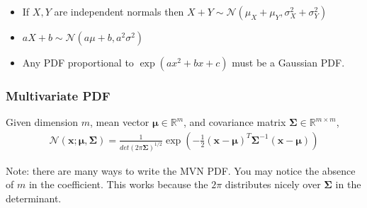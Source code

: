 \documentclass{harvardml}
\theoremstyle{definition}
\theoremstyle{plain}
\newcommand{\R}{\mathbb{R}}
\renewcommand{\v}[1]{\mathbf{#1}}
\begin{document}
		\begin{itemize}
			\item If $X,Y$ are independent normals then $X + Y \sim 
				  \mathcal{N}(\mu_X + \mu_Y, \sigma_X^2 + \sigma_Y^2)$
			\item $aX+b \sim \mathcal{N}(a\mu + b, a^2 \sigma^2)$
			\item Any PDF proportional to $\exp(ax^2 + bx + c)$ 
				  must be a Gaussian PDF.
		\end{itemize}

		\subsubsection{Multivariate PDF}
		Given dimension $m$, mean vector $\v \mu \in \R^m$,
        and covariance matrix $\v \Sigma \in \R^{m \times m}$,
		\begin{align*}
            \mathcal{N}(\v x ; \v \mu, \v \Sigma) = 
                        \frac{1}{det(2\pi\v \Sigma)^{1/2}}
			            \exp \left( -\frac{1}{2} (\v x - \v \mu)^T 
						\v \Sigma^{-1} 
                        (\v x - \v \mu) \right)
		\end{align*}

		\noindent Note: there are many ways to write the MVN PDF. 
		You may notice the absence of $m$ in the coefficient. 
		This works because the $2\pi$ distributes nicely over 
		$\v \Sigma$ in the determinant.
\end{document}
